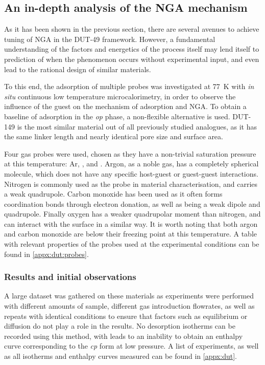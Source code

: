 
\subsection{An in-depth analysis of the NGA mechanism}%
\label{dut:indepth}

As it has been shown in the previous section, there are 
several avenues to achieve tuning of NGA in the DUT-49 framework.
However, a fundamental understanding of the factors and 
energetics of the process itself may
lend itself to prediction of when the phenomenon occurs without 
experimental input, and even lead to the rational design of 
similar materials.

To this end, the adsorption of multiple probes was investigated 
at \SI{77}{\kelvin} with \textit{in situ} continuous low 
temperature microcalorimetry,
in order to observe the influence of the guest on the mechanism of
adsorption and NGA. To obtain a baseline of adsorption in 
the \textit{op} phase, a non-flexible alternative is used. 
DUT-149 is the most similar material out of all previously studied
analogues, as it has the same linker length and nearly identical pore
size and surface area.

Four gas probes were used, chosen as they 
have a non-trivial saturation pressure at this temperature: Ar,
,  and . Argon, as a 
noble gas, has a completely spherical molecule, which does not 
have any specific host-guest or guest-guest interactions. Nitrogen
is commonly used as the probe in material characterisation, 
and carries a weak quadrupole. Carbon monoxide has been used 
as it often forms coordination bonds through electron donation,
as well as being a weak dipole and quadrupole.
Finally oxygen has a weaker quadrupolar moment than 
nitrogen, and can interact with the surface in a similar way.
It is worth noting that both argon and carbon monoxide are below 
their freezing point at this temperature. A table with 
relevant properties of the probes used at the experimental
conditions can be found in \autoref{appx:dut:probes}.

\subsubsection{Results and initial observations}

A large dataset was gathered
on these materials as experiments were performed with different 
amounts of sample, different gas introduction flowrates, as well as repeats
with identical conditions to ensure that factors such as 
equilibrium or diffusion do not play a role in the results. 
No desorption isotherms can be recorded using this method, with
leads to an inability to obtain an enthalpy curve corresponding 
to the \textit{cp} form at low pressure. A list 
of experiments, as well as all isotherms and enthalpy curves measured can
be found in \autoref{appx:dut}. 

